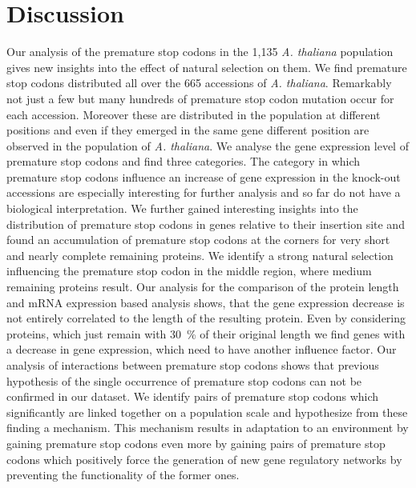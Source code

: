 \chapter{Discussion}
Our analysis of the premature stop codons in the 1,135 \textit{A. thaliana} population gives new insights into the effect of natural selection on them. We find premature stop codons distributed all over the 665 accessions of \textit{A. thaliana}. Remarkably not just a few but many hundreds of premature stop codon mutation occur for each accession.  Moreover these are distributed in the population at different positions and even if they emerged in the same gene different position are observed in the population of \textit{A. thaliana}. We analyse the gene expression level of premature stop codons and find three categories. The category in which premature stop codons influence an increase of gene expression in the knock-out accessions are especially interesting for further analysis and so far do not have a biological interpretation. We further gained interesting insights into the distribution of premature stop codons in genes relative to their insertion site and found an accumulation of premature stop codons at the corners for very short and nearly complete remaining proteins. We identify a strong natural selection influencing the premature stop codon in the middle region, where medium remaining proteins result. Our analysis for the comparison of the protein length and mRNA expression based analysis shows, that the gene expression decrease is not entirely correlated to the length of the resulting protein. Even by considering proteins, which just remain with \SI{30}{\percent} of their original length we find genes with a decrease in gene expression, which need to have another influence factor. Our analysis of interactions between premature stop codons shows that previous hypothesis of the single occurrence of premature stop codons can not be confirmed in our dataset. We identify pairs of premature stop codons which significantly are linked together on a population scale and hypothesize from these finding a mechanism. This mechanism results in adaptation to an environment by gaining premature stop codons even more by gaining pairs of premature stop codons which positively force the generation of new gene regulatory networks by preventing the functionality of the former ones.  

